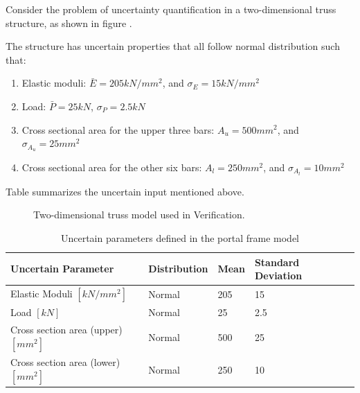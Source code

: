 Consider the problem of uncertainty quantification in a two-dimensional truss structure, as shown in figure . 

The structure has uncertain properties that all follow normal distribution such that:
\begin{enumerate}
\item Elastic moduli: $\bar{E}=205kN/mm^2$, and $\sigma_{E}=15 kN/mm^2$ 
\item Load: $\bar{P}=25kN$, $\sigma_{P}=2.5kN$
\item Cross sectional area for the upper three bars: $A_u=500mm^2$, and $\sigma_{A_u}=25mm^2$
\item  Cross sectional area for the other six bars: $A_l=250mm^2$, and $\sigma_{A_l}=10mm^2$
\end{enumerate}

Table  summarizes the uncertain input mentioned above. 

\begin{figure}[!htbp]
  \caption{Two-dimensional truss model used in Verification.}
  \label{fig:truss}
\end{figure}

\begin{table}[hbt!]                       
  \centering
\begin{adjustbox}{max width=\textwidth}            
  \begin{tabular}{lllll}                    
    \toprule          
      Uncertain Parameter & 	Distribution	 &  Mean  &  Standard Deviation \\ \hline
	Elastic Moduli $[kN/mm^2]$	 & Normal & 	205	 & 15 \\ \hline
	Load $[kN]$ & 	Normal	 & 25	 & 2.5 \\ \hline
  Cross section area (upper) $[mm^2]$ & Normal &   500  & 25 \\ \hline
  Cross section area (lower) $[mm^2]$ & Normal &   250  & 10 \\ \hline
  \end{tabular}
\end{adjustbox}
  \caption{Uncertain parameters defined in the portal frame model}             
  \label{tab:uncertainty}                 
\end{table}

